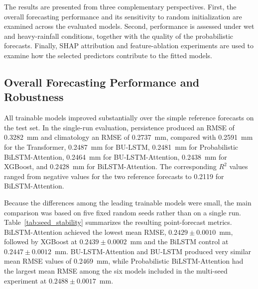 \documentclass[referee,pdflatex,sn-basic]{sn-jnl}%
\theoremstyle{thmstyleone}%
\theoremstyle{thmstyletwo}%
\theoremstyle{thmstylethree}%
\begin{document}
The results are presented from three complementary perspectives. First, the overall forecasting performance and its sensitivity to random initialization are examined across the evaluated models. Second, performance is assessed under wet and heavy-rainfall conditions, together with the quality of the probabilistic forecasts. Finally, SHAP attribution and feature-ablation experiments are used to examine how the selected predictors contribute to the fitted models.

\subsection{Overall Forecasting Performance and Robustness}
\label{sec:overall_results}

All trainable models improved substantially over the simple reference forecasts on the test set. In the single-run evaluation, persistence produced an RMSE of 0.3282~mm and climatology an RMSE of 0.2737~mm, compared with 0.2591~mm for the Transformer, 0.2487~mm for BU-LSTM, 0.2481~mm for Probabilistic BiLSTM-Attention, 0.2464~mm for BU-LSTM-Attention, 0.2438~mm for XGBoost, and 0.2428~mm for BiLSTM-Attention. The corresponding $R^2$ values ranged from negative values for the two reference forecasts to 0.2119 for BiLSTM-Attention.

Because the differences among the leading trainable models were small, the main comparison was based on five fixed random seeds rather than on a single run. Table~\ref{tab:seed_stability} summarizes the resulting point-forecast metrics. BiLSTM-Attention achieved the lowest mean RMSE, $0.2429\pm0.0010$~mm, followed by XGBoost at $0.2439\pm0.0002$~mm and the BiLSTM control at $0.2447\pm0.0012$~mm. BU-LSTM-Attention and BU-LSTM produced very similar mean RMSE values of 0.2469~mm, while Probabilistic BiLSTM-Attention had the largest mean RMSE among the six models included in the multi-seed experiment at $0.2488\pm0.0017$~mm.
\end{document}
